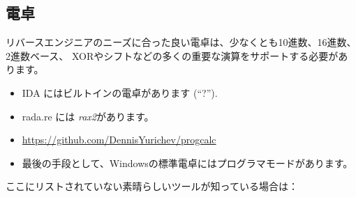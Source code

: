 
\subsection{電卓}

リバースエンジニアのニーズに合った良い電卓は、少なくとも10進数、16進数、2進数ベース、
XORやシフトなどの多くの重要な演算をサポートする必要があります。

\begin{itemize}

\item IDA にはビルトインの電卓があります (``?'').

\item rada.re には \emph{rax2}があります。

\item \url{https://github.com/DennisYurichev/progcalc}

\item 最後の手段として、Windowsの標準電卓にはプログラマモードがあります。

\end{itemize}


ここにリストされていない素晴らしいツールが知っている場合は：\\
\TT{\EMAIL}
